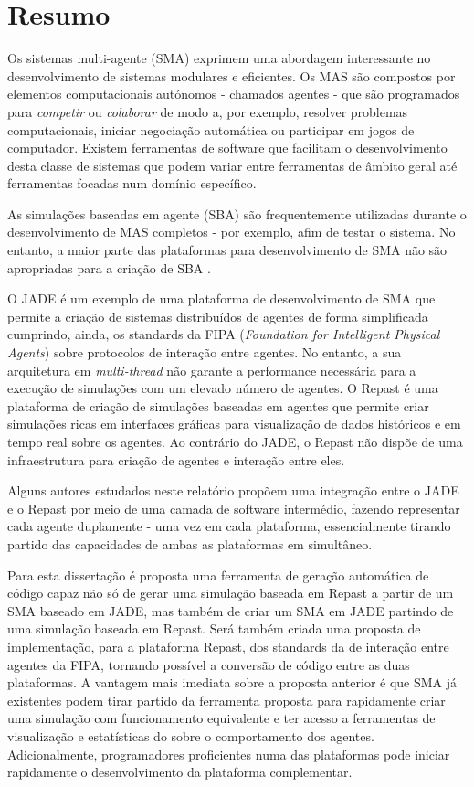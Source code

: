 \chapter*{Resumo}

Os sistemas multi-agente (SMA) exprimem uma abordagem interessante no desenvolvimento de sistemas modulares e eficientes. Os MAS são compostos por elementos computacionais autónomos - chamados agentes - que são programados para \emph{competir} ou \emph{colaborar} de modo a, por exemplo, resolver problemas computacionais, iniciar negociação automática ou participar em jogos de computador. Existem ferramentas de software que facilitam o desenvolvimento desta classe de sistemas que podem variar entre ferramentas de âmbito geral até ferramentas focadas num domínio específico.

As simulações baseadas em agente (SBA) são frequentemente utilizadas durante o desenvolvimento de MAS completos - por exemplo, afim de testar o sistema. No entanto, a maior parte das plataformas para desenvolvimento de SMA não são apropriadas para a criação de SBA \cite{mengistu2008scalability}.

O JADE \cite{bellifemine2003jade} é um exemplo de uma plataforma de desenvolvimento de SMA que permite a criação de sistemas distribuídos de agentes de forma simplificada cumprindo, ainda, os standards da FIPA (\emph{Foundation for Intelligent Physical Agents}) sobre protocolos de interação entre agentes. No entanto, a sua arquitetura em \emph{multi-thread} não garante a performance necessária para a execução de simulações com um elevado número de agentes. O Repast \cite{collier2003repast} é uma plataforma de criação de simulações baseadas em agentes que permite criar simulações ricas em interfaces gráficas para visualização de dados históricos e em tempo real sobre os agentes. Ao contrário do JADE, o Repast não dispõe de uma infraestrutura para criação de agentes e interação entre eles.

Alguns autores estudados neste relatório \cite{garcia2011misia,gormer2011jrep} propõem uma integração entre o JADE e o Repast por meio de uma camada de software intermédio, fazendo representar cada agente duplamente - uma vez em cada plataforma, essencialmente tirando partido das capacidades de ambas as plataformas em simultâneo.

Para esta dissertação é proposta uma ferramenta de geração automática de código capaz não só de gerar uma simulação baseada em Repast a partir de um SMA baseado em JADE, mas também de criar um SMA em JADE partindo de uma simulação baseada em Repast. Será também criada uma proposta de implementação, para a plataforma Repast, dos standards da de interação entre agentes da FIPA, tornando possível a conversão de código entre as duas plataformas. A vantagem mais imediata sobre a proposta anterior é que SMA já existentes podem tirar partido da ferramenta proposta para rapidamente criar uma simulação com funcionamento equivalente e ter acesso a ferramentas de visualização e estatísticas do sobre o comportamento dos agentes. Adicionalmente, programadores proficientes numa das plataformas pode iniciar rapidamente o desenvolvimento da plataforma complementar.

